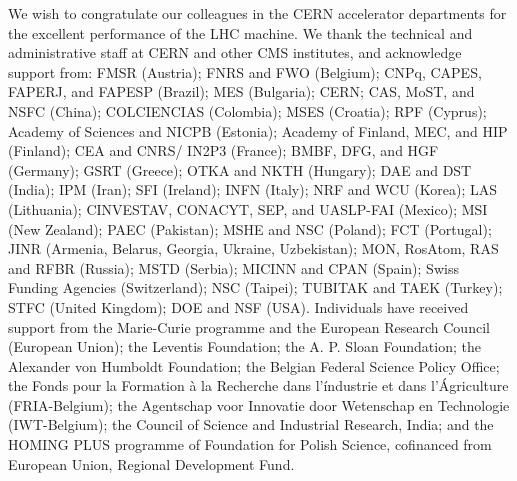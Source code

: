 We wish to congratulate our colleagues in the CERN accelerator departments for the excellent
performance of the LHC machine. We thank the technical and administrative staff at CERN and other CMS
institutes, and acknowledge support from: FMSR (Austria); FNRS and FWO (Belgium); CNPq, CAPES, FAPERJ,
and FAPESP (Brazil); MES (Bulgaria); CERN; CAS, MoST, and NSFC (China); COLCIENCIAS (Colombia); MSES
(Croatia); RPF (Cyprus); Academy of Sciences and NICPB (Estonia); Academy of Finland, MEC, and HIP
(Finland); CEA and CNRS/ IN2P3 (France); BMBF, DFG, and HGF (Germany); GSRT (Greece); OTKA and NKTH
(Hungary); DAE and DST (India); IPM (Iran); SFI (Ireland); INFN (Italy); NRF and WCU (Korea); LAS
(Lithuania); CINVESTAV, CONACYT, SEP, and UASLP-FAI (Mexico); MSI (New Zealand); PAEC (Pakistan);
MSHE and NSC (Poland); FCT (Portugal); JINR (Armenia, Belarus, Georgia, Ukraine, Uzbekistan); MON,
RosAtom, RAS and RFBR (Russia); MSTD (Serbia); MICINN and CPAN (Spain); Swiss Funding Agencies
(Switzerland); NSC (Taipei); TUBITAK and TAEK (Turkey); STFC (United Kingdom); DOE and NSF (USA).
Individuals have received support from the Marie-Curie programme and the European Research Council
(European Union); the Leventis Foundation; the A. P. Sloan Foundation; the Alexander von Humboldt
Foundation; the Belgian Federal Science Policy Office; the Fonds pour la Formation \`a la Recherche
dans l'\'industrie et dans l'\'Agriculture (FRIA-Belgium); the Agentschap voor Innovatie door Wetenschap
en Technologie (IWT-Belgium); the Council of Science and Industrial Research, India; and the HOMING
PLUS programme of Foundation for Polish Science, cofinanced from European Union, Regional Development
Fund.
